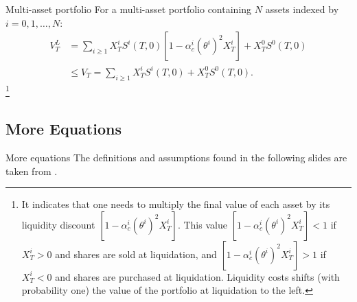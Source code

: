 \documentclass[compress, 10pt, notes]{beamer}  %
\begin{document}
\begin{frame}{Multi-asset portfolio}
    For a multi-asset portfolio containing $N$ assets indexed by $i=0,1,\ldots,N$:
    \begin{align*}
        V_T^L &= \sum_{i \geq 1}X_T^i S^i(T,0)[1 - \alpha_c^i (\theta^i)^2 X^i_T] + X^0_T S^0(T,0) \\
        &\leq V_T = \sum_{i \geq 1}X_T^i S^i(T,0) +  X^0_T S^0(T,0).
    \end{align*}\footnote{It indicates that one needs to multiply the
    final value of each asset by its liquidity discount $[1 - \alpha_c^i (\theta^i)^2 X^i_T]$. This
    value $[1 - \alpha_c^i (\theta^i)^2 X^i_T] < 1$ if $X_T^i > 0$ and shares are sold at liquidation,
    and $[1 - \alpha_c^i (\theta^i)^2 X^i_T] > 1$ if $X_T^i < 0$ and shares are purchased at liquidation.
    Liquidity costs shifts (with probability one) the value of the portfolio at
    liquidation to the left.}
\end{frame}

\subsection{More Equations}
\begin{frame}{More equations}
  The definitions and assumptions found in the following slides are taken from \cite{juri2014}.
\end{frame}
\end{document}
